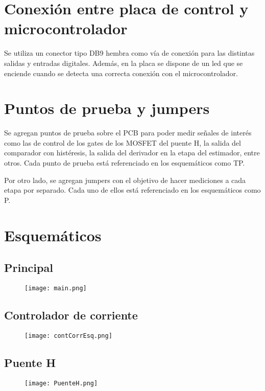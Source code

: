 \section{Conexión entre placa de control y microcontrolador}

Se utiliza un conector tipo DB9 hembra como vía de conexión para las distintas salidas y entradas digitales. Además, en la placa se dispone de un led que se enciende cuando  se detecta una correcta conexión con el microcontrolador.

\section{Puntos de prueba y jumpers}

Se agregan puntos de prueba sobre el PCB para poder medir señales de interés como las de control de los gates de los MOSFET del puente H, la salida del comparador con histéresis, la salida del derivador en la etapa del estimador, entre otros. Cada punto de prueba está referenciado en los esquemáticos como TP.

Por otro lado, se agregan jumpers con el objetivo de hacer mediciones a cada etapa por separado. Cada uno de ellos está referenciado en los esquemáticos como P.
 

\section{Esquemáticos}

\subsection{Principal}
\begin{figure}[H]
	\centering
	\texttt{[image: main.png]}
	\label{fig:main}
\end{figure}

\subsection{Controlador de corriente}
\begin{figure}[H]
	\centering
	\texttt{[image: contCorrEsq.png]}
	\label{fig:contCorrEsq}
\end{figure}

\subsection{Puente H}
\begin{figure}[H]
	\centering
	\texttt{[image: PuenteH.png]}
	\label{fig:PuenteH}
\end{figure}

